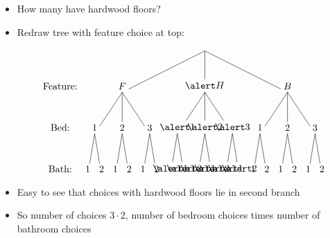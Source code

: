 \documentclass{beamer}
\theoremstyle{definition}
\begin{document}
\begin{frame}
\begin{itemize}
\item How many have hardwood floors?
\item Redraw tree with feature choice at top:
\[\begin{xy}<.5cm,0cm>:
(8.5,0)="0";
(2.5,-3)="1";
(8.5,-3)="2";
(14.5,-3)="3";
"0";"1"*+!D{F}**\dir{-};
"0";"2"*+!D{\alert H}**\dir{-};
"0";"3"*+!D{B}**\dir{-};
(.5,-6)="11";
(2.5,-6)="12";
(4.5,-6)="13";
(6.5,-6)="21";
(8.5,-6)="22";
(10.5,-6)="23";
(12.5,-6)="31";
(14.5,-6)="32";
(16.5,-6)="33";
"1";"11"*+!D{1}**\dir{-};
"1";"12"*+!D{2}**\dir{-};
"1";"13"*+!D{3}**\dir{-};
"2";"21"*+!D{\alert 1}**\dir{-};
"2";"22"*+!D{\alert 2}**\dir{-};
"2";"23"*+!D{\alert 3}**\dir{-};
"3";"31"*+!D{1}**\dir{-};
"3";"32"*+!D{2}**\dir{-};
"3";"33"*+!D{3}**\dir{-};
"11";(0,-9)*+!D{1}**\dir{-};
"11";(1,-9)*+!D{2}**\dir{-};
"12";(2,-9)*+!D{1}**\dir{-};
"12";(3,-9)*+!D{2}**\dir{-};
"13";(4,-9)*+!D{1}**\dir{-};
"13";(5,-9)*+!D{2}**\dir{-};
"21";(6,-9)*+!D{\alert 1}**\dir{-};
"21";(7,-9)*+!D{\alert 2}**\dir{-};
"22";(8,-9)*+!D{\alert 1}**\dir{-};
"22";(9,-9)*+!D{\alert 2}**\dir{-};
"23";(10,-9)*+!D{\alert 1}**\dir{-};
"23";(11,-9)*+!D{\alert 2}**\dir{-};
"31";(12,-9)*+!D{1}**\dir{-};
"31";(13,-9)*+!D{2}**\dir{-};
"32";(14,-9)*+!D{1}**\dir{-};
"32";(15,-9)*+!D{2}**\dir{-};
"33";(16,-9)*+!D{1}**\dir{-};
"33";(17,-9)*+!D{2}**\dir{-};
(-2,-3)*+!D{\text{Feature:}};
(-2,-6)*+!D{\text{Bed:}};
(-2,-9)*+!D{\text{Bath:}};
\end{xy}\]
\item Easy to see that choices with hardwood floors
lie in second branch
\item So number of choices $3\cdot 2$, number
of bedroom choices times number of bathroom choices
\end{itemize}
\end{frame}
\end{document}
